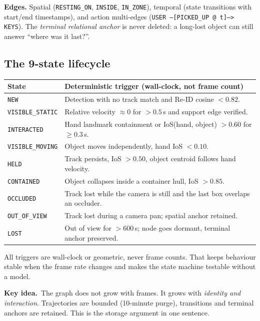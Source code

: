 \documentclass[10pt,a4paper]{article}
\newcommand{\code}[1]{\texttt{\small #1}}
\newcommand{\keyidea}[1]{%
  \par\medskip\noindent\colorbox{panel}{%
    \begin{minipage}{\dimexpr\linewidth-2\fboxsep\relax}
    \vspace{2pt}\textbf{\textcolor{accent}{Key idea.}}\ #1\vspace{2pt}
    \end{minipage}}\par\medskip
}
\begin{document}
\noindent
\textbf{Edges.} Spatial (\code{RESTING\_ON}, \code{INSIDE}, \code{IN\_ZONE}), temporal (state
transitions with start/end timestamps), and action multi-edges
(\code{USER --[PICKED\_UP @ t]--> KEYS}). The \emph{terminal relational anchor} is never deleted:
a long-lost object can still answer ``where was it last?''.

\subsection{The 9-state lifecycle}

\begin{center}
\small
\begin{tabularx}{\linewidth}{@{}l L@{}}
\toprule
\textbf{State} & \textbf{Deterministic trigger (wall-clock, not frame count)} \\
\midrule
\code{NEW} & Detection with no track match and Re-ID cosine \(< 0.82\). \\
\code{VISIBLE\_STATIC} & Relative velocity \(\approx 0\) for \(>0.5\)\,s and support edge verified. \\
\code{INTERACTED} & Hand landmark containment or IoS(hand, object) \(>0.60\) for \(\geq 0.3\)\,s. \\
\code{VISIBLE\_MOVING} & Object moves independently, hand IoS \(< 0.10\). \\
\code{HELD} & Track persists, IoS \(>0.50\), object centroid follows hand velocity. \\
\code{CONTAINED} & Object collapses inside a container hull, IoS \(>0.85\). \\
\code{OCCLUDED} & Track lost while the camera is still and the last box overlaps an occluder. \\
\code{OUT\_OF\_VIEW} & Track lost during a camera pan; spatial anchor retained. \\
\code{LOST} & Out of view for \(>600\)\,s; node goes dormant, terminal anchor preserved. \\
\bottomrule
\end{tabularx}
\end{center}

\noindent
All triggers are wall-clock or geometric, never frame counts. That keeps behaviour stable when the
frame rate changes and makes the state machine testable without a model.

\keyidea{The graph does not grow with frames. It grows with \emph{identity and interaction}.
Trajectories are bounded (10-minute purge), transitions and terminal anchors are retained. This is
the storage argument in one sentence.}
\end{document}
